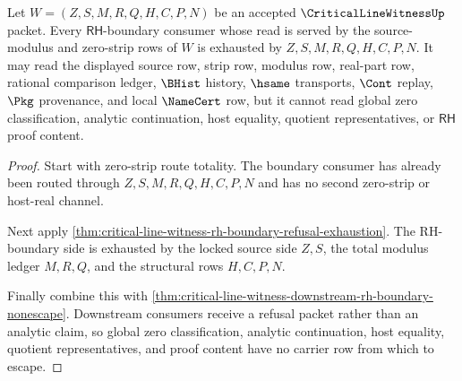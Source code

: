 \begin{theorem}
\label{thm:criticallinewitness-rh-boundary-nonescape}
Let $W=(Z,S,M,R,Q,H,C,P,N)$ be an accepted $\CriticalLineWitnessUp$ packet. Every $\mathsf{RH}$-boundary consumer whose read is served by the source-modulus and zero-strip rows of $W$ is exhausted by $Z,S,M,R,Q,H,C,P,N$. It may read the displayed source row, strip row, modulus row, real-part row, rational comparison ledger, $\BHist$ history, $\hsame$ transports, $\Cont$ replay, $\Pkg$ provenance, and local $\NameCert$ row, but it cannot read global zero classification, analytic continuation, host equality, quotient representatives, or $\mathsf{RH}$ proof content.
\end{theorem}
\begin{proof}
Start with zero-strip route totality. The boundary consumer has already been routed through $Z,S,M,R,Q,H,C,P,N$ and has no second zero-strip or host-real channel.

Next apply \autoref{thm:critical-line-witness-rh-boundary-refusal-exhaustion}. The RH-boundary side is exhausted by the locked source side $Z,S$, the total modulus ledger $M,R,Q$, and the structural rows $H,C,P,N$.

Finally combine this with \autoref{thm:critical-line-witness-downstream-rh-boundary-nonescape}. Downstream consumers receive a refusal packet rather than an analytic claim, so global zero classification, analytic continuation, host equality, quotient representatives, and proof content have no carrier row from which to escape.
\end{proof}
